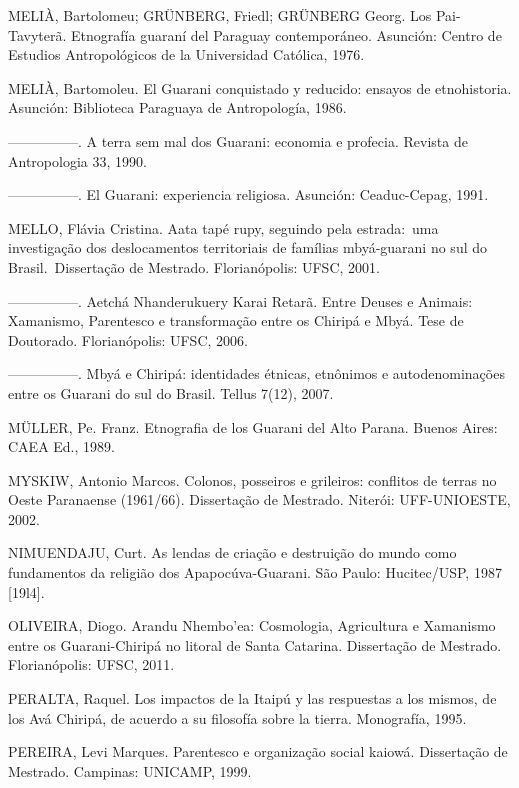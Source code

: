 \documentclass{article}
\begin{document}
MELI\`A, Bartolomeu; GR\"UNBERG, Friedl; GR\"UNBERG Georg. Los
Pai-Tavyter\~a. Etnograf\'ia guaran\'i del Paraguay contempor\'aneo.
Asunci\'on: Centro de Estudios Antropol\'ogicos de la Universidad
Cat\'olica, 1976.

MELI\`A, Bartomoleu. El Guarani conquistado y reducido: ensayos de
etnohistoria. Asunci\'on: Biblioteca Paraguaya de Antropolog\'ia, 1986.

{}---{}---{}---{}---{}---. A terra sem mal dos Guarani: economia e
profecia. Revista de Antropologia 33, 1990. 

{}---{}---{}---{}---{}---. El Guarani: experiencia religiosa.
Asunci\'on: Ceaduc-Cepag, 1991.

MELLO, Fl\'avia Cristina. Aata tap\'e rupy, seguindo pela estrada:~uma
investiga\c{c}\~ao dos deslocamentos territoriais de fam\'ilias
mby\'a-guarani no sul do Brasil.~Disserta\c{c}\~ao de Mestrado.
Florian\'opolis: UFSC, 2001.

{}---{}---{}---{}---{}---. Aetch\'a Nhanderukuery Karai Retar\~a. Entre
Deuses e Animais: Xamanismo, Parentesco e transforma\c{c}\~ao entre os
Chirip\'a e Mby\'a. Tese de Doutorado. Florian\'opolis: UFSC, 2006. 

{}---{}---{}---{}---{}---. Mby\'a e Chirip\'a: identidades \'etnicas,
etn\^onimos e autodenomina\c{c}\~oes entre os Guarani do sul do Brasil.
Tellus 7(12), 2007.

M\"ULLER, Pe. Franz. Etnografia de los Guarani del Alto Parana. Buenos
Aires: CAEA Ed., 1989.

MYSKIW, Antonio Marcos. Colonos, posseiros e grileiros: conflitos de
terras no Oeste Paranaense (1961/66). Disserta\c{c}\~ao de Mestrado.
Niter\'oi: UFF-UNIOESTE, 2002.

NIMUENDAJU, Curt.  As lendas de cria\c{c}\~ao e destrui\c{c}\~ao do
mundo como fundamentos da religi\~ao dos Apapoc\'uva-Guarani. S\~ao
Paulo: Hucitec/USP, 1987 [19l4].

OLIVEIRA, Diogo. Arandu Nhembo{\textquoteright}ea: Cosmologia,
Agricultura e Xamanismo entre os Guarani-Chirip\'a no litoral de Santa
Catarina. Disserta\c{c}\~ao de Mestrado. Florian\'opolis: UFSC, 2011.

PERALTA, Raquel. Los impactos de la Itaip\'u y las respuestas a los
mismos, de los Av\'a Chirip\'a, de acuerdo a su filosof\'ia sobre la
tierra. Monograf\'ia, 1995.

PEREIRA, Levi Marques. Parentesco e organiza\c{c}\~ao social kaiow\'a.
Disserta\c{c}\~ao de Mestrado. Campinas: UNICAMP, 1999.
\end{document}
